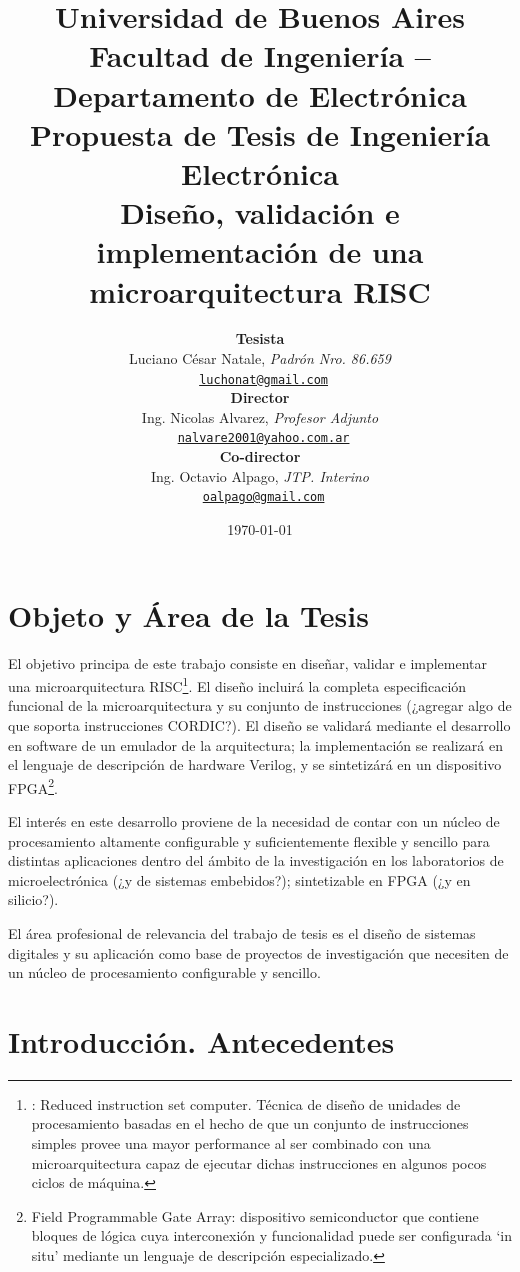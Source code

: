 \documentclass[a4paper]{article}
\title{
	{\normalsize
		Universidad de Buenos Aires\\
		Facultad de Ingeniería -- Departamento de Electrónica\\
		Propuesta de Tesis de Ingeniería Electrónica\\
		\vspace{0.7cm}
	}
	Diseño, validación e implementación de una microarquitectura RISC
}
\author{	\textbf{Tesista}															\\
			Luciano César Natale, \textit{Padrón Nro. 86.659}               			\\
            \texttt{ \href{mailto:luchonat@gmail.com}{luchonat@gmail.com}}			\\[2.5ex]
            \textbf{Director}																\\
            Ing. Nicolas Alvarez, \textit{Profesor Adjunto}             				\\
            \texttt{ \href{mailto:nalvare2001@yahoo.com.ar}{nalvare2001@yahoo.com.ar}}  \\[2.5ex]
            \textbf{Co-director}															\\
            Ing. Octavio Alpago, \textit{JTP. Interino}               					\\
            \texttt{ \href{mailto:oalpago@gmail.com}{oalpago@gmail.com}}                \\[2.5ex]
       }
\date{\today}
\begin{document}
\maketitle



\thispagestyle{fancy}

\section{Objeto y Área de la Tesis}

El objetivo principa de este trabajo consiste en diseñar, validar e implementar una microarquitectura RISC\footnote{\label{RISC}: Reduced instruction set
computer. Técnica de diseño de unidades de procesamiento basadas en el hecho de que un conjunto de instrucciones simples provee una mayor performance al ser
combinado con una microarquitectura capaz de ejecutar dichas instrucciones en algunos pocos ciclos de máquina.}. El diseño incluirá la completa
especificación funcional de la microarquitectura y su conjunto de instrucciones (¿agregar algo de que soporta instrucciones CORDIC?). El diseño se validará
mediante el desarrollo en software de un emulador de la arquitectura; la implementación se realizará en el lenguaje de descripción de hardware Verilog, y se
sintetizárá en un dispositivo FPGA\footnote{\label{FPGA}Field Programmable Gate Array: dispositivo semiconductor que contiene bloques de lógica cuya
interconexión y funcionalidad puede ser configurada `in situ' mediante un lenguaje de descripción especializado.}.

El interés en este desarrollo proviene de la necesidad de contar con un núcleo de procesamiento altamente configurable y suficientemente flexible y sencillo
para distintas aplicaciones dentro del ámbito de la investigación en los laboratorios de microelectrónica (¿y de sistemas embebidos?); sintetizable en FPGA
(¿y en silicio?).

El área profesional de relevancia del trabajo de tesis es el diseño de sistemas digitales y su aplicación como base de proyectos de investigación que
necesiten de un núcleo de procesamiento configurable y sencillo.

\newpage

\section{Introducción. Antecedentes}
\end{document}
